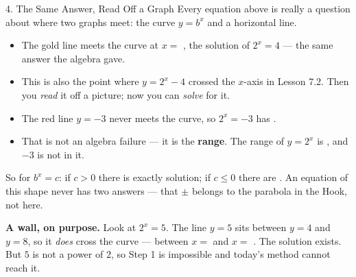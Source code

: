 \documentclass[10pt]{article}
\newcommand{\lgrid}[4]{%
  \draw[step=1, linegray!40, very thin] (#1,#3) grid (#2,#4);
  \draw[->, semithick, charcoal] (#1,0)--(#2,0) node[below right, font=\scriptsize]{$x$};
  \draw[->, semithick, charcoal] (0,#3)--(0,#4) node[left, font=\scriptsize]{$y$};}
\newcommand{\expgraph}[6]{\draw[very thick, forest, domain=#5:#6, samples=140, smooth]
  plot (\x,{(#1)*exp((#2)*((\x)-(#3)))+(#4)});}
\newcommand{\solline}[3]{\draw[goldacc, very thick] (#1,#3)--(#2,#3);}
\begin{document}
\begin{notesbox}{4. The Same Answer, Read Off a Graph}
Every equation above is really a question about where two graphs meet: the curve $y=b^{x}$ and a
horizontal line.
\begin{center}
\begin{minipage}[c]{0.42\linewidth}
\centering
{}
\end{minipage}
\begin{minipage}[c]{0.54\linewidth}
\small
\begin{itemize}[leftmargin=1.3em, itemsep=4pt]
  \item The gold line meets the curve at $x=$ \blank{1.2cm}, the solution of $2^{x}=4$ --- the same
        answer the algebra gave.
  \item This is also the point where $y=2^{x}-4$ crossed the $x$-axis in Lesson 7.2. Then you
        \emph{read} it off a picture; now you can \emph{solve} for it.
  \item The red line $y=-3$ never meets the curve, so $2^{x}=-3$ has \blank{2.6cm}.
  \item That is not an algebra failure --- it is the \textbf{range}. The range of $y=2^{x}$ is
        \blank{2.2cm}, and $-3$ is not in it.
\end{itemize}
\end{minipage}
\end{center}

\vspace{3pt}
So for $b^{x}=c$: if $c>0$ there is exactly \blank{1.6cm} solution; if $c\le0$ there are
\blank{1.6cm}. An equation of this shape never has two answers --- that $\pm$ belongs to the parabola
in the Hook, not here.

\vspace{5pt}
\begin{tcolorbox}[colback=sky, colframe=navy, boxrule=0.8pt, arc=1.5mm,
    left=2.5mm, right=2.5mm, top=1.5mm, bottom=1.5mm]
\textbf{A wall, on purpose.} Look at $2^{x}=5$. The line $y=5$ sits between $y=4$ and $y=8$, so it
\emph{does} cross the curve --- between $x=$ \blank{1.0cm} and $x=$ \blank{1.0cm}. The solution
exists. But $5$ is not a power of $2$, so Step 1 is impossible and today's method cannot reach it.


\end{tcolorbox}
\end{notesbox}
\end{document}
